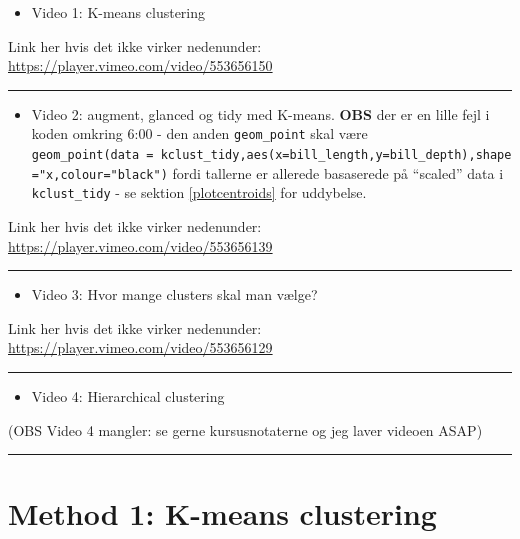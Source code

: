 \documentclass[
]{book}
\providecommand{\tightlist}{%
  \setlength{\itemsep}{0pt}\setlength{\parskip}{0pt}}
\begin{document}
\begin{itemize}
\tightlist
\item
  Video 1: K-means clustering
\end{itemize}

Link her hvis det ikke virker nedenunder: \url{https://player.vimeo.com/video/553656150}

\begin{center}\rule{0.5\linewidth}{0.5pt}\end{center}

\begin{itemize}
\tightlist
\item
  Video 2: augment, glanced og tidy med K-means. \textbf{OBS} der er en lille fejl i koden omkring 6:00 - den anden \texttt{geom\_point} skal være \texttt{geom\_point(data\ =\ kclust\_tidy,aes(x=bill\_length,y=bill\_depth),shape="x,colour="black")} fordi tallerne er allerede basaserede på ``scaled'' data i \texttt{kclust\_tidy} - se sektion \ref{plotcentroids} for uddybelse.
\end{itemize}

Link her hvis det ikke virker nedenunder: \url{https://player.vimeo.com/video/553656139}

\begin{center}\rule{0.5\linewidth}{0.5pt}\end{center}

\begin{itemize}
\tightlist
\item
  Video 3: Hvor mange clusters skal man vælge?
\end{itemize}

Link her hvis det ikke virker nedenunder: \url{https://player.vimeo.com/video/553656129}

\begin{center}\rule{0.5\linewidth}{0.5pt}\end{center}

\begin{itemize}
\tightlist
\item
  Video 4: Hierarchical clustering
\end{itemize}

(OBS Video 4 mangler: se gerne kursusnotaterne og jeg laver videoen ASAP)

\begin{center}\rule{0.5\linewidth}{0.5pt}\end{center}

\hypertarget{method-1-k-means-clustering}{%
\section{Method 1: K-means clustering}\label{method-1-k-means-clustering}}
\end{document}

